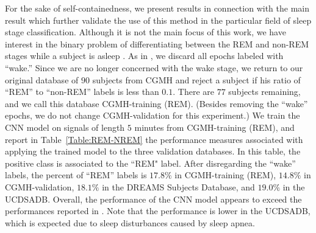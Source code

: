 \documentclass[10pt,a4paper,english]{amsart}
\begin{document}
For the sake of self-containedness, we present results in connection with the main result which further validate the use of this method in the particular field of sleep stage classification.  Although it is not the main focus of this work, we have interest in the binary problem of differentiating between the REM and non-REM stages while a subject is asleep \cite{Mendez2010,Aktaruzzaman2015}. As in \cite{Aktaruzzaman2015}, we discard all epochs labeled with ``wake.''  Since we are no longer concerned with the wake stage, we return to our original database of $90$ subjects from CGMH and reject a subject if his ratio of ``REM'' to ``non-REM'' labels is less than $0.1$. There are $77$ subjects remaining, and we call this database CGMH-training (REM). (Besides removing the ``wake'' epochs, we do not change CGMH-validation for this experiment.)  We train the CNN model on signals of length $5$ minutes from CGMH-training (REM), and report in Table~\ref{Table:REM-NREM} the performance measures associated with applying the trained model to the three validation databases. In this table, the positive class is associated to the ``REM" label. After disregarding the ``wake'' labels, the percent of ``REM'' labels is $17.8\%$ in CGMH-training (REM), $14.8\%$ in CGMH-validation, $18.1\%$ in the DREAMS Subjects Database, and $19.0\%$ in the UCDSADB. Overall, the performance of the CNN model appears to exceed the performances reported in \cite{Mendez2010,Aktaruzzaman2015}. Note that the performance is lower in the UCDSADB, which is expected due to sleep disturbances caused by sleep apnea.
\end{document}
